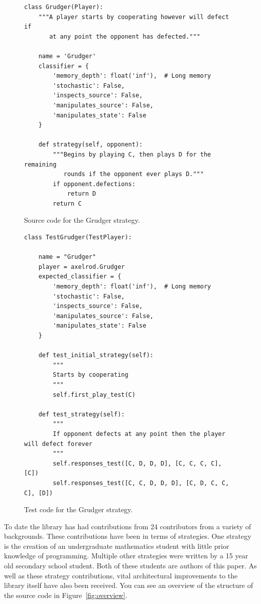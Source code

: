 \documentclass{jors}
\begin{document}
\begin{figure}[!hbtp]
    \begin{verbatim}
class Grudger(Player):
    """A player starts by cooperating however will defect if
       at any point the opponent has defected."""

    name = 'Grudger'
    classifier = {
        'memory_depth': float('inf'),  # Long memory
        'stochastic': False,
        'inspects_source': False,
        'manipulates_source': False,
        'manipulates_state': False
    }

    def strategy(self, opponent):
        """Begins by playing C, then plays D for the remaining
           rounds if the opponent ever plays D."""
        if opponent.defections:
            return D
        return C
    \end{verbatim}
    \caption{Source code for the Grudger strategy.}
    \label{fig:grudger}
\end{figure}



\begin{figure}[!hbtp]
    \begin{verbatim}
class TestGrudger(TestPlayer):

    name = "Grudger"
    player = axelrod.Grudger
    expected_classifier = {
        'memory_depth': float('inf'),  # Long memory
        'stochastic': False,
        'inspects_source': False,
        'manipulates_source': False,
        'manipulates_state': False
    }

    def test_initial_strategy(self):
        """
        Starts by cooperating
        """
        self.first_play_test(C)

    def test_strategy(self):
        """
        If opponent defects at any point then the player will defect forever
        """
        self.responses_test([C, D, D, D], [C, C, C, C], [C])
        self.responses_test([C, C, D, D, D], [C, D, C, C, C], [D])
    \end{verbatim}
    \caption{Test code for the Grudger strategy.}
    \label{fig:grudger_test}
\end{figure}

To date the library has had contributions from 24 contributors from a variety
of backgrounds. These contributions have been in terms of strategies. One
strategy is the creation of an undergraduate mathematics student with little
prior knowledge of programming. Multiple other strategies were written by a 15
year old secondary school student. Both of these students are authors of this
paper. As well as these strategy contributions, vital architectural
improvements to the library itself have also been received. You can see an
overview of the structure of the source code in Figure~\ref{fig:overview}.
\end{document}
